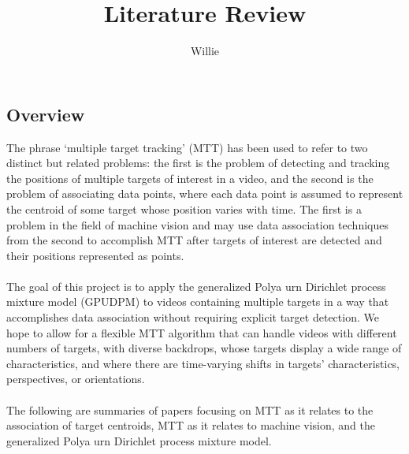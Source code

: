 \documentclass{article}
\begin{document}
\title{Literature Review}
\author{Willie}
\maketitle
\mbox{}



\subsection*{Overview}
\vspace{6pt}
The phrase `multiple target tracking' (MTT) has been used to refer to two distinct but related problems: the first is the problem of detecting and tracking the positions of multiple targets of interest in a video, and the second is the problem of associating data points, where each data point is assumed to represent the centroid of some target whose position varies with time. The first is a problem in the field of machine vision and may use data association techniques from the second to accomplish MTT after targets of interest are detected and their positions represented as points.\\
\\
The goal of this project is to apply the generalized Polya urn Dirichlet process mixture model (GPUDPM) to videos containing multiple targets in a way that accomplishes data association without requiring explicit target detection. We hope to allow for a flexible MTT algorithm that can handle videos with different numbers of targets, with diverse backdrops, whose targets display a wide range of characteristics, and where there are time-varying shifts in targets' characteristics, perspectives, or orientations.\\
\\
The following are summaries of papers focusing on MTT as it relates to the association of target centroids, MTT as it relates to machine vision, and the generalized Polya urn Dirichlet process mixture model.
\end{document}
